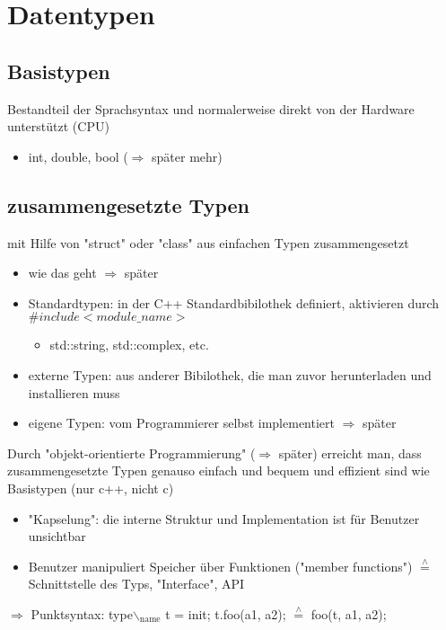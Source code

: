 \documentclass[a4paper]{scrartcl}
\newcommand{\estimates}{\overset{\scriptscriptstyle\wedge}{=}}%
\begin{document}
\section{Datentypen}
\label{sec-10}
\subsection{Basistypen}
\label{sec-10-1}
Bestandteil der Sprachsyntax und normalerweise direkt von der Hardware unterstützt (CPU)
\begin{itemize}
\item int, double, bool ($\Rightarrow$ später mehr)
\end{itemize}
\subsection{zusammengesetzte Typen}
\label{sec-10-2}
mit Hilfe von "struct" oder "class" aus einfachen Typen zusammengesetzt
\begin{itemize}
\item wie das geht $\Rightarrow$ später
\item Standardtypen: in der C++ Standardbibilothek definiert, aktivieren durch $\#include <module\_name>$
\begin{itemize}
\item std::string, std::complex, etc.
\end{itemize}
\item externe Typen: aus anderer Bibilothek, die man zuvor herunterladen und installieren muss
\item eigene Typen: vom Programmierer selbst implementiert $\Rightarrow$ später
\end{itemize}
Durch "objekt-orientierte Programmierung" ($\Rightarrow$ später) erreicht man, dass zusammengesetzte
 Typen genauso einfach und bequem und effizient sind wie Basistypen (nur c++, nicht c)
\begin{itemize}
\item "Kapselung": die interne Struktur und Implementation ist für Benutzer unsichtbar
\item Benutzer manipuliert Speicher über Funktionen ("member functions") $\estimates$ Schnittstelle des Typs, "Interface", API
\end{itemize}

$\Rightarrow$ Punktsyntax: type$\backslash$$_{\text{name}}$ t = init; t.foo(a1, a2); $\estimates$ foo(t, a1, a2);
\end{document}

